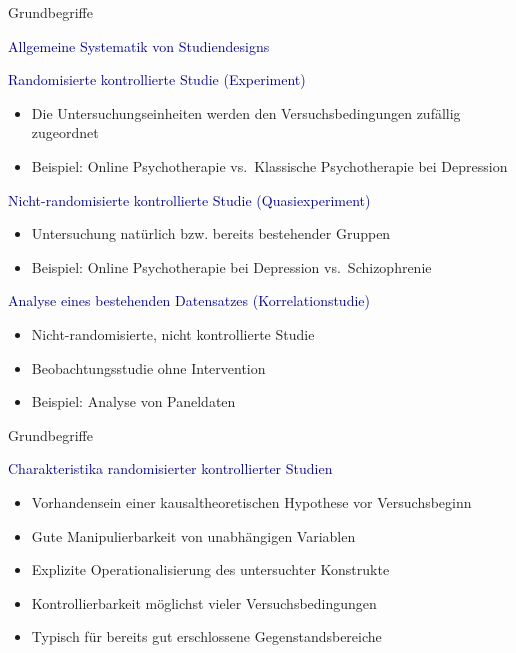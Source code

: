 \documentclass[
  8pt,
  ignorenonframetext,
]{beamer}
\providecommand{\tightlist}{%
  \setlength{\itemsep}{0pt}\setlength{\parskip}{0pt}}
\begin{document}
\begin{frame}{Grundbegriffe}
\protect\hypertarget{grundbegriffe-3}{}

\textcolor{darkblue}{Allgemeine Systematik von Studiendesigns} \small

\textcolor{darkblue}{Randomisierte kontrollierte Studie (Experiment)}

\begin{itemize}
\tightlist
\item
  Die Untersuchungseinheiten werden den Versuchsbedingungen zufällig
  zugeordnet
\item
  Beispiel: Online Psychotherapie vs.~Klassische Psychotherapie bei
  Depression
\end{itemize}

\vspace{1mm}

\textcolor{darkblue}{Nicht-randomisierte kontrollierte Studie (Quasiexperiment)}

\begin{itemize}
\tightlist
\item
  Untersuchung natürlich bzw. bereits bestehender Gruppen
\item
  Beispiel: Online Psychotherapie bei Depression vs.~Schizophrenie
\end{itemize}

\vspace{1mm}

\textcolor{darkblue}{Analyse eines bestehenden Datensatzes (Korrelationstudie)}

\begin{itemize}
\tightlist
\item
  Nicht-randomisierte, nicht kontrollierte Studie
\item
  Beobachtungsstudie ohne Intervention
\item
  Beispiel: Analyse von Paneldaten
\end{itemize}
\end{frame}

\begin{frame}{Grundbegriffe}
\protect\hypertarget{grundbegriffe-4}{}

\textcolor{darkblue}{Charakteristika randomisierter kontrollierter Studien}

\begin{itemize}
\tightlist
\item
  Vorhandensein einer kausaltheoretischen Hypothese vor Versuchsbeginn
\item
  Gute Manipulierbarkeit von unabhängigen Variablen
\item
  Explizite Operationalisierung des untersuchter Konstrukte
\item
  Kontrollierbarkeit möglichst vieler Versuchsbedingungen
\item
  Typisch für bereits gut erschlossene Gegenstandsbereiche
\end{itemize}
\end{frame}
\end{document}
